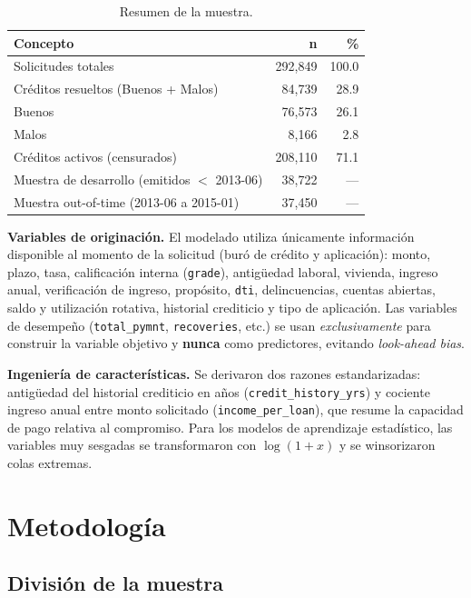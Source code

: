 \documentclass[11pt, letterpaper]{article}
\newcommand{\bt}[1]{\textbf{#1}}
\begin{document}
\begin{table}[H]
  \centering
  \caption{Resumen de la muestra.}
  \label{tab:datos}
  \begin{tabular}{lrr}
    \toprule
    Concepto & n & \% \\
    \midrule
    Solicitudes totales                          & 292,849 & 100.0 \\
    \quad Créditos resueltos (Buenos + Malos)     &  84,739 &  28.9 \\
    \quad\quad Buenos                             &  76,573 &  26.1 \\
    \quad\quad Malos                              &   8,166 &   2.8 \\
    \quad Créditos activos (censurados)           & 208,110 &  71.1 \\
    \midrule
    Muestra de desarrollo (emitidos $<$ 2013-06) &  38,722 & --- \\
    Muestra out-of-time (2013-06 a 2015-01)      &  37,450 & --- \\
    \bottomrule
  \end{tabular}
\end{table}

\textbf{Variables de originación.} El modelado utiliza únicamente información
disponible al momento de la solicitud (buró de crédito y aplicación):
monto, plazo, tasa, calificación interna (\texttt{grade}), antigüedad laboral,
vivienda, ingreso anual, verificación de ingreso, propósito, \texttt{dti},
delincuencias, cuentas abiertas, saldo y utilización rotativa, historial
crediticio y tipo de aplicación. Las variables de desempeño
(\texttt{total\_pymnt}, \texttt{recoveries}, etc.) se usan \emph{exclusivamente}
para construir la variable objetivo y \bt{nunca} como predictores, evitando
\emph{look-ahead bias}.

\textbf{Ingeniería de características.} Se derivaron dos razones
estandarizadas: antigüedad del historial crediticio en años
(\texttt{credit\_history\_yrs}) y cociente ingreso anual entre monto solicitado
(\texttt{income\_per\_loan}), que resume la capacidad de pago relativa al
compromiso. Para los modelos de aprendizaje estadístico, las variables muy
sesgadas se transformaron con $\log(1+x)$ y se winsorizaron colas extremas.

\section{Metodología}

\subsection{División de la muestra}
\end{document}
